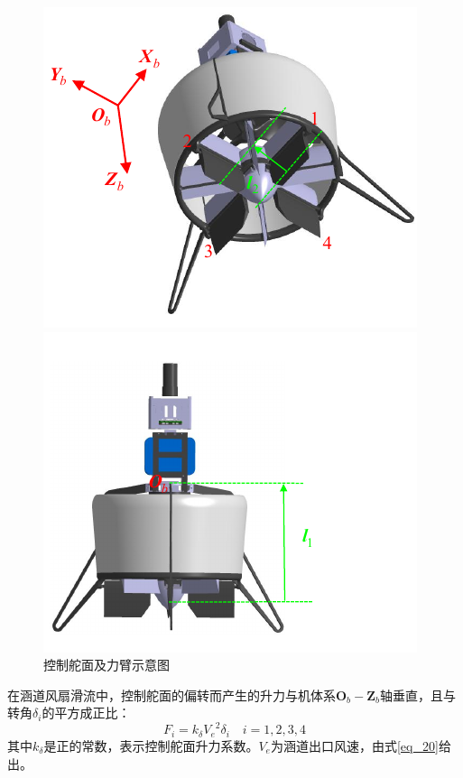 \begin{figure}[htbp]
	\centering
	\begin{minipage}[c]{0.5\textwidth} %
		\centering
		\includegraphics[scale=1]{Fig/控制舵面.pdf}
	\end{minipage}%
	\begin{minipage}[c]{0.5\textwidth}
		\centering
		\includegraphics[scale=1]{Fig/力臂.pdf}
	\end{minipage}
    \caption{\label{控制舵面}控制舵面及力臂示意图}
\end{figure}

在涵道风扇滑流中，控制舵面的偏转而产生的升力与机体系${\boldsymbol{O}_b}-{\boldsymbol{Z}_b}$轴垂直，且与转角$\delta_i$的平方成正比\cite{pflimlinModelingAttitudeControl2010a}：
\begin{equation}
    F_i=k_\delta{V_e}^2\delta_i \quad i=1,2,3,4
    \label{eq_35}
\end{equation}
其中$k_\delta$是正的常数，表示控制舵面升力系数。${V_e}$为涵道出口风速，由式\eqref{eq_20}给出。


